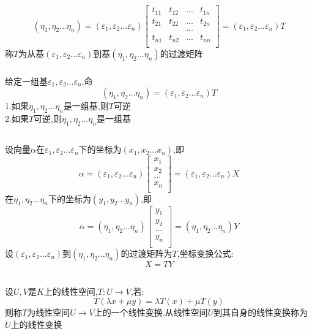 \documentclass[11pt, a4paper, UTF8]{ctexart}
\begin{document}
\subsection{}
\[(\eta_1,\eta_2...\eta_n)=(\varepsilon_1,\varepsilon_2...\varepsilon_n)\begin{bmatrix}
t_{11}&t_{12}&...&t_{1n}\\
t_{21}&t_{22}&...&t_{2n}\\
&&...&\\
t_{n1}&t_{n2}&...&t_{nn}\\
\end{bmatrix}=(\varepsilon_1,\varepsilon_2...\varepsilon_n)T\]
称$T$为从基$(\varepsilon_1,\varepsilon_2...\varepsilon_n)$到基$(\eta_1,\eta_2...\eta_n)$的过渡矩阵\\
\subsubsection{}
给定一组基$\varepsilon_1,\varepsilon_2...\varepsilon_n$,命
\[(\eta_1,\eta_2...\eta_n)=(\varepsilon_1,\varepsilon_2...\varepsilon_n)T\]
1.如果$\eta_1,\eta_2...\eta_n$是一组基,则$T$可逆\\
2.如果$T$可逆,则$\eta_1,\eta_2...\eta_n$是一组基
\subsection{}
设向量$\alpha$在$\varepsilon_1,\varepsilon_2...\varepsilon_n$下的坐标为$(x_1,x_2...x_n)$,即
\[\alpha=(\varepsilon_1,\varepsilon_2...\varepsilon_n)\begin{bmatrix}
x_1\\
x_2\\
...\\
x_n\\
\end{bmatrix}=(\varepsilon_1,\varepsilon_2...\varepsilon_n)X\]
在$\eta_1,\eta_2...\eta_n$下的坐标为$(y_1,y_2...y_n)$,即\\
\[\alpha=(\eta_1,\eta_2...\eta_n)\begin{bmatrix}
y_1\\
y_2\\
...\\
y_n\\
\end{bmatrix}=(\eta_1,\eta_2...\eta_n)Y\]
设$(\varepsilon_1,\varepsilon_2...\varepsilon_n)$到$(\eta_1,\eta_2...\eta_n)$的过渡矩阵为$T$,坐标变换公式:
\[X=TY\]
\subsection{}
设$U,V$是$K$上的线性空间,$T:U\to V$,若:\\
\[T(\lambda x+\mu y)=\lambda T(x)+\mu T(y)\]
则称$T$为线性空间$U\to V$上的一个线性变换.从线性空间$U$到其自身的线性变换称为$U$上的线性变换\\
\end{document}
